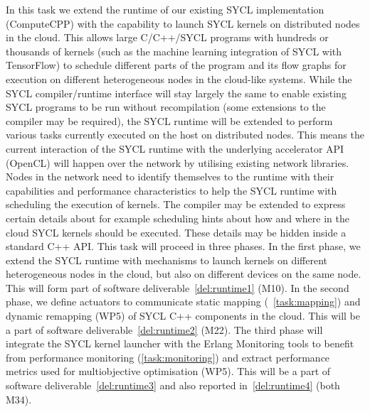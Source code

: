 \begin{Workpackage}{\thewpno}
\begin{Task}
\TaskResults{
\ref{del:runtime1}
\ref{del:runtime2}
\ref{del:runtime3}
\ref{del:runtime4}
}
\TaskHeader{}

In this task we extend the runtime of our existing SYCL implementation (ComputeCPP) with the capability to launch SYCL kernels on distributed nodes in the cloud. This allows large C/C++/SYCL programs with hundreds or thousands of kernels (such as the machine learning integration of SYCL with TensorFlow) to schedule different parts of the program and its flow graphs for execution on different heterogeneous nodes in the cloud-like systems. While the SYCL compiler/runtime interface will stay largely the same to enable existing SYCL programs to be run without recompilation (some extensions to the compiler may be required), the SYCL runtime will be extended to perform various tasks currently executed on the host on distributed nodes. This means the current interaction of the SYCL runtime with the underlying accelerator API (OpenCL) will happen over the network by utilising existing network libraries. Nodes in the network need to identify themselves to the runtime with their capabilities and performance characteristics to help the SYCL runtime with scheduling the execution of kernels. The compiler may be extended to express certain details about for example scheduling hints about how and where in the cloud SYCL kernels should be executed. These details may be hidden inside a standard C++ API. This task will proceed in three phases. In the first phase, we extend the SYCL runtime with mechanisms to launch kernels on different heterogeneous nodes in the cloud, but also on different devices on the same node. This will form part of software deliverable~\ref{del:runtime1} (M10).
In the second phase, we define actuators to communicate static mapping (~\ref{task:mapping}) and dynamic remapping (WP5) of SYCL C++ components in the cloud. This will be a part of software deliverable~\ref{del:runtime2} (M22).
The third phase will integrate the SYCL kernel launcher with the Erlang Monitoring tools to benefit from performance monitoring (\ref{task:monitoring}) and extract performance metrics used for multiobjective optimisation (WP5). This will be a part of software deliverable~\ref{del:runtime3} and also reported in~\ref{del:runtime4} (both M34).


\end{Task}
\end{Workpackage}
